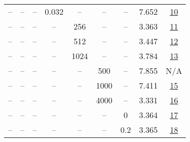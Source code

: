 \begin{table}[H]
\begin{tabular}{ccccccccc}
-- & -- & -- & 0.032 & -- & -- & -- & 7.652 & \href{https://wandb.ai/stanford-mercury/optimizer-scaling/runs/sweep-130m-10B-mini7491aelr0.032-wd0.1-minlr0-warmup2000-b10.9-b-eec75e}{10} \\
-- & -- & -- & -- & 256 & -- & -- & 3.363 & \href{https://wandb.ai/stanford-mercury/optimizer-scaling/runs/sweep-130m-10B-mini5a8324lr0.008-wd0.1-minlr0-warmup2000-b10.9-b-b209a4}{11} \\
-- & -- & -- & -- & 512 & -- & -- & 3.447 & \href{https://wandb.ai/stanford-mercury/optimizer-scaling/runs/sweep-130m-10B-mini845331lr0.008-wd0.1-minlr0-warmup2000-b10.9-b-d5fe03}{12} \\
-- & -- & -- & -- & 1024 & -- & -- & 3.784 & \href{https://wandb.ai/stanford-mercury/optimizer-scaling/runs/sweep-130m-10B-mini3fca05lr0.008-wd0.1-minlr0-warmup2000-b10.9-b-a825c0}{13} \\
-- & -- & -- & -- & -- & 500 & -- & 7.855 & N/A \\
-- & -- & -- & -- & -- & 1000 & -- & 7.411 & \href{https://wandb.ai/stanford-mercury/optimizer-scaling/runs/sweep-130m-10B-mini684316lr0.008-wd0.1-minlr0-warmup1000-b10.9-b-419ffe}{15} \\
-- & -- & -- & -- & -- & 4000 & -- & 3.331 & \href{https://wandb.ai/stanford-mercury/optimizer-scaling/runs/sweep-130m-10B-mini48c902lr0.008-wd0.1-minlr0-warmup4000-b10.9-b-c9d5f8}{16} \\
-- & -- & -- & -- & -- & -- & 0 & 3.364 & \href{https://wandb.ai/stanford-mercury/optimizer-scaling/runs/sweep-130m-10B-mini774178lr0.008-wd0-minlr0-warmup2000-b10.9-b20-1ab0b9}{17} \\
-- & -- & -- & -- & -- & -- & 0.2 & 3.365 & \href{https://wandb.ai/stanford-mercury/optimizer-scaling/runs/sweep-130m-10B-minic5c69blr0.008-wd0.2-minlr0-warmup2000-b10.9-b-0638b6}{18} \\
\bottomrule
\end{tabular}
\end{table}

